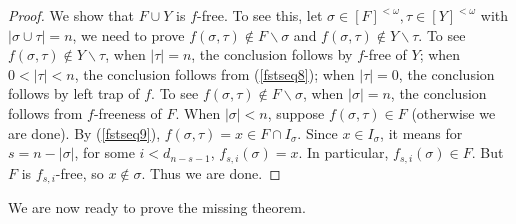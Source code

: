 \documentclass{amsart}
\theoremstyle{definition}
\theoremstyle{remark}
\numberwithin{equation}{section}
\theoremstyle{noparens}
\renewcommand{\setminus}{\smallsetminus}
\begin{document}
\begin{proof}
We show that $F\cup Y$ is $f$-free.
To see this, let $\sigma\in [F]^{<\omega},\tau\in [Y]^{<\omega}$
with $|\sigma\cup \tau|=n$, we need to prove
$f(\sigma,\tau)\notin F\setminus\sigma$
and $f(\sigma,\tau)\notin Y\setminus \tau$.
To see $f(\sigma,\tau)\notin Y\setminus \tau$,
when $|\tau| = n$, the conclusion follows by $f$-free of $Y$;
when $0<|\tau|<n$, the conclusion follows from (\ref{fstseq8});
when $|\tau| = 0$, the conclusion follows by left trap of $f$.
To see $f(\sigma,\tau)\notin F\setminus\sigma$,
when $|\sigma| = n$, the conclusion follows from $f$-freeness of $F$.
When $|\sigma|<n$,
suppose $f(\sigma,\tau)\in F$ (otherwise we are done).
By (\ref{fstseq9}),
 $f(\sigma,\tau)=x\in F\cap I_\sigma$.
Since $x\in I_\sigma$, it means for  $s=n-|\sigma|$,
for some $i<d_{n-s-1}$, $f_{s,i}(\sigma)=x$.
In particular, $f_{s,i}(\sigma)\in F$.
But $F$ is $f_{s,i}$-free, so $x\notin \sigma$. Thus we are done.






\end{proof}

We are now ready to prove the missing theorem.
\end{document}
